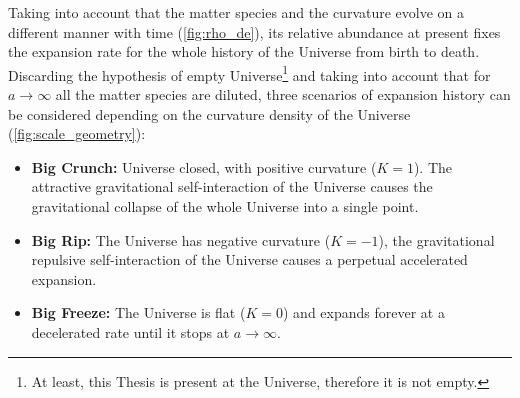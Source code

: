 Taking into account that the matter species and the curvature evolve on a different manner with time (\autoref{fig:rho_de}), its relative abundance at present fixes the expansion rate for the whole history of the Universe from birth to death. Discarding the hypothesis of empty Universe\footnote{At least, this Thesis is present at the Universe, therefore it is not empty.} and taking into account that for $a\rightarrow\infty$ all the matter species are diluted, three scenarios of expansion history can be considered depending on the curvature density of the Universe (\autoref{fig:scale_geometry}):
\begin{itemize}
\item {\bf Big Crunch:} Universe closed, with positive curvature ($K=1$). The attractive gravitational self-interaction of the Universe causes the gravitational collapse of the whole Universe into a single point.
\item {\bf Big Rip:} The Universe has negative curvature ($K=-1$), the gravitational repulsive self-interaction of the Universe causes a perpetual accelerated expansion.
\item {\bf Big Freeze:} The Universe is flat ($K=0$) and expands forever at a decelerated rate until it stops at $a\rightarrow\infty$.
\end{itemize}

